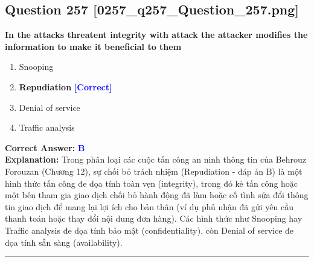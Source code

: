 \documentclass[11pt,a4paper]{article}
\begin{document}
\begin{minipage}{\textwidth}
\subsection*{Question 257 \quad \footnotesize{[0257\_q257\_Question\_257.png]}}
\noindent \textbf{In the attacks threatent integrity with attack the attacker modifies the information to make it beneficial to them}

\begin{enumerate}[label=\Alph*.]
    \item Snooping
    \item \textbf{Repudiation} \hfill \textcolor{blue}{\textbf{[Correct]}}
    \item Denial of service
    \item Traffic analysis
\end{enumerate}

\noindent \textbf{Correct Answer:} \textcolor{blue}{\textbf{B}} \\[2pt]
\noindent \textbf{Explanation:} Trong phân loại các cuộc tấn công an ninh thông tin của Behrouz Forouzan (Chương 12), sự chối bỏ trách nhiệm (Repudiation - đáp án B) là một hình thức tấn công đe dọa tính toàn vẹn (integrity), trong đó kẻ tấn công hoặc một bên tham gia giao dịch chối bỏ hành động đã làm hoặc cố tình sửa đổi thông tin giao dịch để mang lại lợi ích cho bản thân (ví dụ phủ nhận đã gửi yêu cầu thanh toán hoặc thay đổi nội dung đơn hàng). Các hình thức như Snooping hay Traffic analysis đe dọa tính bảo mật (confidentiality), còn Denial of service đe dọa tính sẵn sàng (availability).

\par\vspace{0.3cm}
\hrule
\vspace{0.3cm}
\end{minipage}
\end{document}
